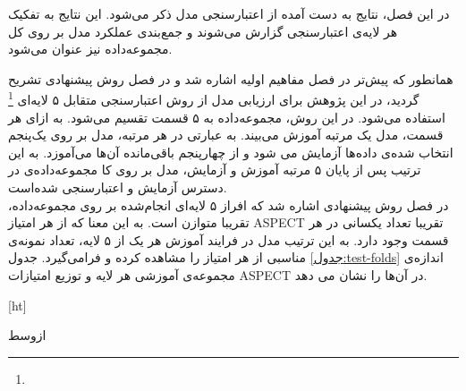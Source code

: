 

در این فصل، نتایج به دست آمده از اعتبارسنجی مدل ذکر می‌شود.
این نتایج به تفکیک هر لایه‌ی اعتبارسنجی گزارش می‌شوند و جمع‌بندی عملکرد مدل بر روی کل مجموعه‌داده نیز عنوان می‌شود.


همانطور که پیش‌تر در فصل مفاهیم اولیه اشاره شد و در فصل روش پیشنهادی تشریح گردید، در این پژوهش برای ارزیابی مدل از روش اعتبارسنجی متقابل ۵ لایه‌ای
\footnote{}
استفاده می‌شود.
در این روش، مجموعه‌داده به ۵ قسمت تقسیم می‌شود.
به ازای هر قسمت، مدل یک مرتبه آموزش می‌بیند.
به عبارتی در هر مرتبه،  مدل بر روی یک‌پنجم انتخاب شده‌ی داده‌ها آزمایش می شود و از چهار‌پنجم باقی‌مانده آن‌ها می‌آموزد.
به این ترتیب پس از پایان ۵ مرتبه آموزش و آزمایش، مدل بر روی کا مجموعه‌داده‌ی در دسترس آزمایش و اعتبارسنجی شده‌است.\\

در فصل روش پیشنهادی اشاره شد که افراز ۵ لایه‌ای انجام‌شده بر روی مجموعه‌داده، تقریبا متوازن است.
به این معنا که از هر امتیاز ASPECT تقریبا تعداد یکسانی در هر قسمت وجود دارد.
به این ترتیب مدل در فرایند آموزش هر یک از ۵ لایه، تعداد نمونه‌ی مناسبی از هر امتیاز را مشاهده کرده و فرامی‌گیرد.
جدول \ref{جدول:test-folds} اندازه‌ی مجموعه‌ی آموزشی هر لایه و توزیع امتیازات ASPECT در آن‌ها را نشان می دهد.

[ht]

\vspace{1.5em}

‌ازوسط

